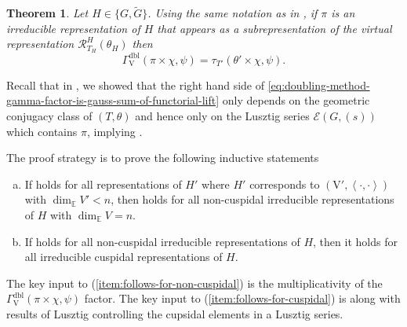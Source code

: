 \documentclass[12pt, reqno]{amsart}
\newtheorem{theorem}{Theorem}[section]
\theoremstyle{definition}
\theoremstyle{definition}
\theoremstyle{definition}
\newcommand{\hermitianSpace}{\mathrm{V}}
\newcommand{\innerproduct}[2]{\left\langle #1,#2\right\rangle}
\newcommand{\fieldCharacter}{\psi}
\newcommand{\GroupExtension}[1]{\widetilde{#1}}
\newcommand{\quadraticExtension}{\mathbb{E}}
\newcommand{\dblGammaFactorSpace}[4]{\Gamma^{\mathrm{dbl}}_{#1}\left(#2 \times #3, #4\right)}
\newcommand{\GaussSumTorusCharacter}[4]{\tau_{#1}\left(#2 \times #3, #4\right)}
\newcommand{\LusztigSeries}[2]{\mathcal{E}\left(#1, (#2)\right)}
\newcommand{\RTThetaVirtual}[3]{\mathcal{R}_{#1}^{#2}(#3)}
\begin{document}
\begin{theorem}
\label{thm:doubling-method-gamma-factor-for-deligne-lusztig}
Let $H \in \{G, \GroupExtension{G}\}$. Using the same notation as in , if $\pi$ is an irreducible representation of $H$ that appears as a subrepresentation of the virtual representation $\RTThetaVirtual{T_H}{H}{\theta_{H}}$ then \begin{equation}\label{eq:doubling-method-gamma-factor-is-gauss-sum-of-functorial-lift}
	\dblGammaFactorSpace{\hermitianSpace}{\pi}{\chi}{\fieldCharacter} = \GaussSumTorusCharacter{T'}{\theta'}{\chi}{\fieldCharacter}.
\end{equation}
\end{theorem}
Recall that in , we showed that the right hand side of \eqref{eq:doubling-method-gamma-factor-is-gauss-sum-of-functorial-lift} only depends on the geometric conjugacy class of $(T,\theta)$ and hence only on the Lusztig series $\LusztigSeries{G}{s}$ which contains $\pi$, implying .

The proof strategy is to prove the following inductive statements
\begin{enumerate}[(a)]
	\item \label{item:follows-for-non-cuspidal}If  holds for all representations of $H'$ where $H'$ corresponds to $\left(\hermitianSpace', \innerproduct{\cdot}{\cdot}\right)$ with $\dim_{\quadraticExtension} V' < n$, then  holds for all non-cuspidal irreducible representations of $H$ with $\dim_{\mathbb{E}} V = n$.
	\item \label{item:follows-for-cuspidal}If  holds for all non-cuspidal irreducible representations of $H$, then it holds for all irreducible cuspidal representations of $H$.
\end{enumerate}
The key input to (\ref{item:follows-for-non-cuspidal}) is the multiplicativity of the $\dblGammaFactorSpace{\hermitianSpace}{\pi}{\chi}{\fieldCharacter}$ factor. The key input to (\ref{item:follows-for-cuspidal}) is  along with results of Lusztig controlling the cupsidal elements in a Lusztig series.
\end{document}
